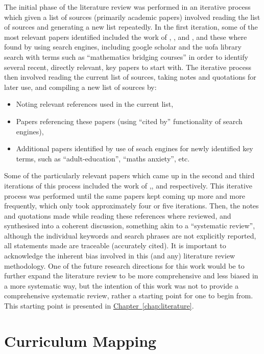 \documentclass[twoside,12pt,a4paper]{report}
\newcommand{\refchap}[1]{\hyperref[chap:#1]{Chapter~\ref{chap:#1}}}
\begin{document}
The initial phase of the literature review was performed in an iterative process which given a list of sources (primarily academic papers) involved reading the list of sources and generating a new list repeatedly. In the first iteration, some of the most relevant papers identified included the work of , , and , and these where found by using search engines, including google scholar and the \gls{uofa} library search with terms such as ``mathematics bridging courses'' in order to identify several recent, directly relevant, key papers to start with. The iterative process then involved reading the current list of sources, taking notes and quotations for later use, and compiling a new list of sources by:
\begin{itemize}
	\item Noting relevant references used in the current list, 
	\item Papers referencing these papers (using ``cited by'' functionality of search engines),
	\item Additional papers identified by use of seach engines for newly identified key terms, such as ``adult-education'', ``maths anxiety'', etc.
\end{itemize}
Some of the particularly relevant papers which came up in the second and third iterations of this process included the work of  ,, and  respectively. This iterative process was performed until the same papers kept coming up more and more frequently, which only took approximately four or five iterations. Then, the notes and quotations made while reading these references where reviewed, and synthesised into a coherent discussion, something akin to a ``systematic review'', although the individual keywords and search phrases are not explicitly reported, all statements made are traceable (accurately cited). It is important to acknowledge the inherent bias involved in this (and any) literature review methodology. One of the future research directions for this work would be to further expand the literature review to be more comprehensive and less biased in a more systematic way, but the intention of this work was not to provide a comprehensive systematic review, rather a starting point for one to begin from. This starting point is presented in \refchap{literature}.



\section{Curriculum Mapping}
\end{document}
